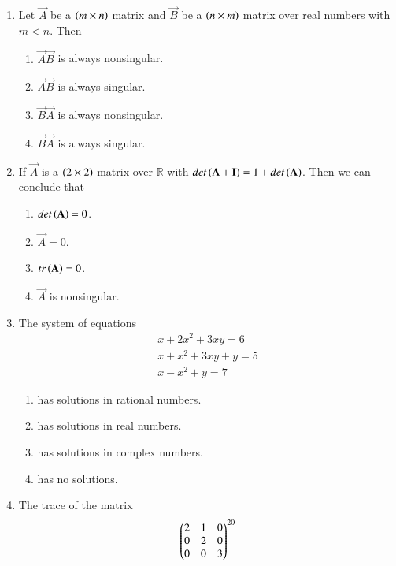 \renewcommand{\theequation}{\theenumi}
\renewcommand{\thefigure}{\theenumi}
\begin{enumerate}[label=\thesection.\arabic*.,ref=\thesection.\theenumi]

\item Let $\vec{A}$ be a $\left(m \times n\right)$ matrix 
and $\vec{B}$ be a $\left(n \times m\right)$ matrix over real numbers with $m < n$.  Then
\begin{enumerate}
\item $\vec{A}\vec{B}$ is always nonsingular.
\item $\vec{A}\vec{B}$ is always singular.
\item $\vec{B}\vec{A}$ is always nonsingular.
\item $\vec{B}\vec{A}$ is always singular.
\end{enumerate}
\solution

%
\item If $\vec{A}$ is a $\left(2\times 2\right)$ matrix over $\mathbb{R}$ with $det\left(\mathbf{A}+\mathbf{I}\right) 
= 1 + det\left(\mathbf{A}\right)$.  Then we can conclude that
\begin{enumerate}
\item $det\left(\mathbf{A}\right) = 0$.
\item $\vec{A} = 0$.
\item $tr\left(\mathbf{A}\right) = 0$.
\item $\vec{A}$ is nonsingular.
\end{enumerate}
%
\solution

\item The system of equations
\begin{align}
x+2x^2+3xy = 6 \\
x+x^2+3xy + y = 5 \\
x-x^2+y = 7
\end{align}
\begin{enumerate}
\item has solutions in rational numbers.
\item has solutions in real numbers.
\item has solutions in complex numbers.
\item has no solutions.
\end{enumerate}
%
\item The trace of the matrix
\begin{align}
\begin{pmatrix}
2 & 1 & 0
\\
0 & 2 & 0
\\
0 & 0 & 3
\end{pmatrix}^{20}
\end{align}

\end{enumerate}
